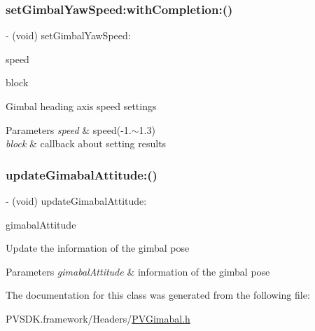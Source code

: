 \subsubsection{\texorpdfstring{set\+Gimbal\+Yaw\+Speed\+:with\+Completion\+:()}{setGimbalYawSpeed:withCompletion:()}}
{\footnotesize\ttfamily -\/ (void) set\+Gimbal\+Yaw\+Speed\+: \begin{DoxyParamCaption}\item[{(float)}]{speed }\item[{withCompletion:(P\+V\+Completion\+Block)}]{block }\end{DoxyParamCaption}}

Gimbal heading axis speed settings


\begin{DoxyParams}{Parameters}
{\em speed} & speed(-\/1.$\sim$1.3) \\
\hline
{\em block} & callback about setting results \\
\hline
\end{DoxyParams}
\mbox{\label{interface_p_v_gimabal_a4936daad2a491d8244a8645a33bdce84}} 
\subsubsection{\texorpdfstring{update\+Gimabal\+Attitude\+:()}{updateGimabalAttitude:()}}
{\footnotesize\ttfamily -\/ (void) update\+Gimabal\+Attitude\+: \begin{DoxyParamCaption}\item[{(\hyperlink{struct_p_v_gimabal_attitude}{P\+V\+Gimabal\+Attitude})}]{gimabal\+Attitude }\end{DoxyParamCaption}}

Update the information of the gimbal pose


\begin{DoxyParams}{Parameters}
{\em gimabal\+Attitude} & information of the gimbal pose \\
\hline
\end{DoxyParams}


The documentation for this class was generated from the following file\+:\begin{DoxyCompactItemize}
\item 
P\+V\+S\+D\+K.\+framework/\+Headers/\hyperlink{_p_v_gimabal_8h}{P\+V\+Gimabal.\+h}\end{DoxyCompactItemize}
